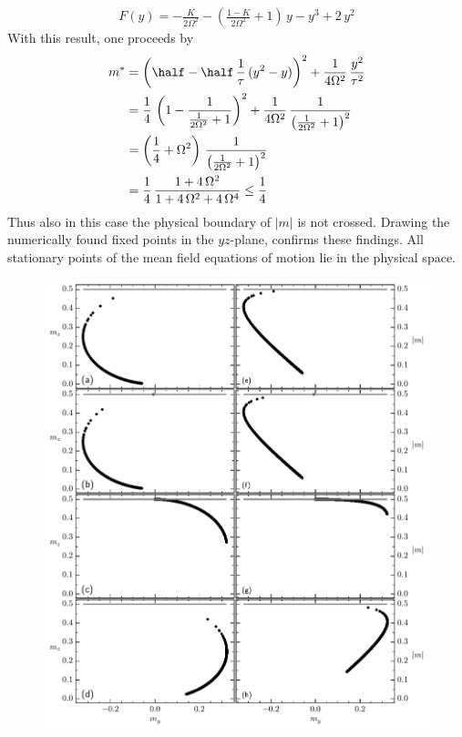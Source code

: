 \begin{appendices}
    \begin{align*}
        F(y)=-\frac{K}{2\Omega^2}-\left( \frac{1-K}{2\Omega^2} +1\right)\,{y}-{y}^3+2\,{y}^2
    \end{align*}
    With this result, one proceeds by
    \begin{align*}
        m^*&=\left( \half- \half\,\frac{1}{\tau}\,(y^2-y) \right)^2+\frac{1}{4\Omega^2}\,\frac{y^2}{\tau^2}\\
        &=\frac{1}{4}\,\left( 1- \frac{1}{\frac{1}{2\Omega^2}+1}\right)^2+\frac{1}{4\Omega^2}\,\frac{1}{\left(\frac{1}{2\Omega^2}+1\right)^2}\\
        &=\left(\frac{1}{4}+\Omega^2\right)\,\frac{1}{\left(\frac{1}{2\Omega^2}+1\right)^2}\\
        &=\frac{1}{4}\,\frac{1+4\,\Omega^2}{1+4\,\Omega^2+4\,\Omega^4}\leq\frac{1}{4}
    \end{align*}
    Thus also in this case the physical boundary of $|m|$ is not crossed. Drawing the numerically found fixed points in the $yz$-plane, confirms these findings. All stationary points of the mean field equations of motion lie in the physical space.
    \begin{figure}[H]
        \hspace*{-0.4cm}
        \includegraphics{pictures/fixp_boundaries.pdf}

\end{figure}
\end{appendices}

